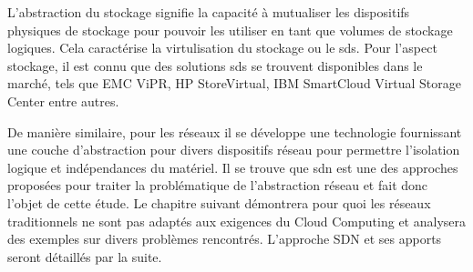 L'abstraction du stockage signifie la capacité à mutualiser les dispositifs physiques de stockage pour pouvoir les utiliser en tant que volumes de stockage logiques. Cela caractérise la virtulisation du stockage ou le \gls{sds}. Pour l'aspect stockage, il est connu que des solutions \gls{sds} se trouvent disponibles dans le marché, tels que EMC ViPR, HP StoreVirtual, IBM SmartCloud Virtual Storage Center entre autres.

De manière similaire, pour les réseaux il se développe une technologie fournissant une couche d'abstraction pour divers dispositifs réseau pour permettre l'isolation logique et indépendances du matériel. Il se trouve que \gls{sdn} est une des approches proposées pour traiter la problématique de l'abstraction réseau et fait donc l'objet de cette étude. Le chapitre suivant démontrera pour quoi les réseaux traditionnels ne sont pas adaptés aux exigences du Cloud Computing et analysera des exemples sur divers problèmes rencontrés. L'approche SDN et ses apports seront détaillés par la suite.
\cite{ibmPlanningVirtCCchap1}  \cite{cloudReadyJuniperReferenceDef} \cite{journeySDDC} \cite{ciscoCCDCStrategyArchiSolutions}

